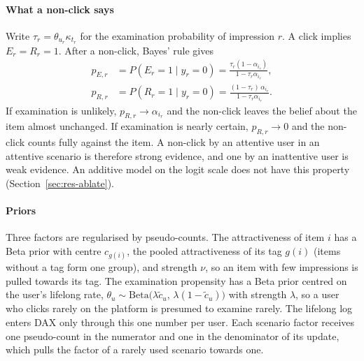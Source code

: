 \documentclass[preprint,12pt,authoryear]{elsarticle}
\begin{document}
\paragraph{What a non-click says} Write $\tau_r=\theta_{u_r}\kappa_{t_r}$ for the examination probability of impression $r$. A click implies
$E_r=R_r=1$. After a non-click, Bayes' rule gives
\begin{equation}
  \begin{aligned}
  p_{E,r}&=P(E_r=1\mid y_r=0)=\frac{\tau_r(1-\alpha_{i_r})}{1-\tau_r\alpha_{i_r}},\\
  p_{R,r}&=P(R_r=1\mid y_r=0)=\frac{(1-\tau_r)\,\alpha_{i_r}}{1-\tau_r\alpha_{i_r}} .
  \end{aligned}
  \label{eq:posterior}
\end{equation}
If examination is unlikely, $p_{R,r}\to\alpha_{i_r}$ and the non-click leaves the belief about the item almost unchanged. If examination is
nearly certain, $p_{R,r}\to0$ and the non-click counts fully against the item. A non-click by an attentive user in an attentive scenario is
therefore strong evidence, and one by an inattentive user is weak evidence. An additive model on the logit scale does not have this property
(Section~\ref{sec:res-ablate}).

\paragraph{Priors} Three factors are regularised by pseudo-counts. The attractiveness of item $i$ has a Beta prior with centre $c_{g(i)}$,
the pooled attractiveness of its tag $g(i)$ (items without a tag form one group), and strength $\nu$, so an item with few impressions is pulled
towards its tag. The examination propensity has a Beta prior centred on the user's lifelong rate, $\theta_u\sim\mathrm{Beta}\bigl(\lambda\tilde c_u,\,
\lambda(1-\tilde c_u)\bigr)$ with strength $\lambda$, so a user who clicks rarely on the platform is presumed to examine rarely. The lifelong log
enters DAX only through this one number per user. Each scenario factor receives one pseudo-count in the numerator and one in the denominator of
its update, which pulls the factor of a rarely used scenario towards one.
\end{document}
